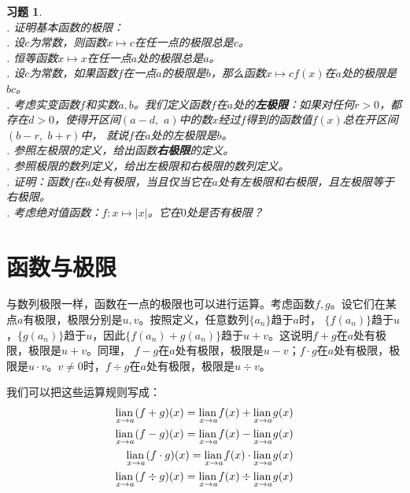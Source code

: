 \documentclass[12pt,UTF8]{ctexbook}
\newcommand\lian[1]{
    \underset{#1}{\operatorname{lian}\,}
}
\newtheorem{xt}{习题}[section]
\begin{document}
\begin{xt}
    \mbox{} \\
    . 证明基本函数的极限：\\
    . 设$c$为常数，则函数$x\mapsto c$在任一点的极限总是$c$。\\
    . 恒等函数$x\mapsto x$在任一点$a$处的极限总是$a$。\\
    . 设$c$为常数，如果函数$f$在一点$a$的极限是$b$，那么函数$x\mapsto cf(x)$在$a$处的极限是$bc$。\\
    . 考虑实变函数$f$和实数$a, b$。我们定义函数$f$在$a$处的\textbf{左极限}：如果对任何$r>0$，都存在$d>0$，使得开区间$(a-d,\,\,a)$中的数$x$经过$f$得到的函数值$f(x)$总在开区间$(b-r,\,\,b+r)$中，
    就说$f$在$a$处的左极限是$b$。\\
    . 参照左极限的定义，给出函数\textbf{右极限}的定义。\\
    . 参照极限的数列定义，给出左极限和右极限的数列定义。\\
    . 证明：函数$f$在$a$处有极限，当且仅当它在$a$处有左极限和右极限，且左极限等于右极限。\\
    . 考虑绝对值函数：$f:x\mapsto |x|$。它在$0$处是否有极限？
\end{xt}

\section{函数与极限}
与数列极限一样，函数在一点的极限也可以进行运算。考虑函数$f,g$。设它们在某点$a$有极限，极限分别是$u, v$。按照定义，任意数列$\{a_n\}$趋于$a$时，
$\{f(a_n)\}$趋于$u$，$\{g(a_n)\}$趋于$u$，因此$\{f(a_n) + g(a_n)\}$趋于$u + v$。这说明$f + g$在$a$处有极限，极限是$u + v$。同理，
$f - g$在$a$处有极限，极限是$u - v$；$f \cdot g$在$a$处有极限，极限是$u \cdot v$。$v\neq 0$时，$f\div g$在$a$处有极限，极限是$u \div v$。

我们可以把这些运算规则写成：
\begin{align}
    \lian{x \to a} (f + g)(x) = \lian{x \to a} f(x) + \lian{x \to a} g(x) \notag \\
    \lian{x \to a} (f - g)(x) = \lian{x \to a} f(x) - \lian{x \to a} g(x) \notag \\
    \lian{x \to a} (f \cdot g)(x) = \lian{x \to a} f(x) \cdot \lian{x \to a} g(x) \notag \\
    \lian{x \to a} (f \div g)(x) = \lian{x \to a} f(x) \div \lian{x \to a} g(x) \notag
\end{align}
\end{document}
